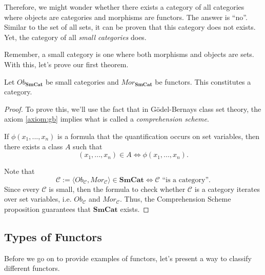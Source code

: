 Therefore, we might wonder whether there exists a category of all categories
where objects are categories and morphisms are functors.
The answer is ``no''. Similar to the set of all sets, it can be proven
that this category does not exists. Yet, the category of all \textit{small categories}
does.

Remember, a small category is one where both morphisms and objects are sets.
With this, let's prove our first theorem.
\begin{theorem}
	Let $Ob_{\textbf{SmCat}}$ be small categories and $Mor_{\textbf{SmCat}}$ be functors.
	This constitutes a category.
\end{theorem}
\begin{proof}
	To prove this, we'll use the fact that in Gödel-Bernays class set theory, the
	axiom \ref{axiom:gb} implies what is called a \textit{comprehension scheme}.
	\begin{proposition}
		If $\phi(x_1,...,x_n)$ is a formula that the quantification occurs on set variables, then
		there exists a class $A$ such that
		\begin{displaymath}
			(x_1,...,x_n) \in A \iff \phi(x_1,...,x_n).
		\end{displaymath}
	\end{proposition}
	Note that
	\begin{displaymath}
		\mathcal C := \langle Ob_\mathcal C, Mor_\mathcal C \rangle \in \textbf{SmCat} \iff
		\mathcal C \text{ ``is a category''}.
	\end{displaymath}
	Since every $\mathcal C$ is small, then the formula to check whether $\mathcal C$ is a category
	iterates over set variables, i.e. $Ob_\mathcal C$ and $Mor_\mathcal C$.
	Thus, the Comprehension Scheme proposition guarantees that $\textbf{SmCat}$ exists.
\end{proof}

\subsection{Types of Functors}

Before we go on to provide examples of functors, let's present
a way to classify different functors.

